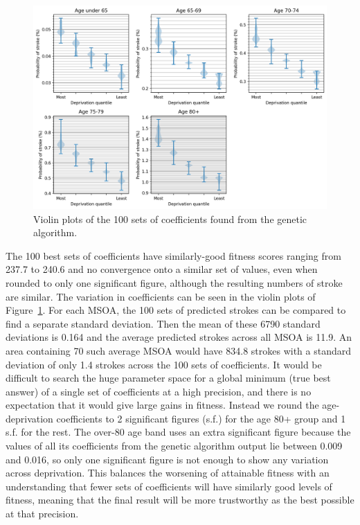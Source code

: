 \documentclass[12pt]{extarticle}
\begin{document}

\begin{figure}
    \centering
    \includegraphics[width=1.0\linewidth]{images/violin_coeffs_deap_output.png}
    \caption{Violin plots of the 100 sets of coefficients found from the genetic algorithm.}
    \label{fig:violin_coeffs_from_deap}
\end{figure}

The 100 best sets of coefficients have similarly-good fitness scores ranging from 237.7 to 240.6 and no convergence onto a similar set of values, even when rounded to only one significant figure, although the resulting numbers of stroke are similar.
The variation in coefficients can be seen in the violin plots of Figure~\ref{fig:violin_coeffs_from_deap}.
% 
For each MSOA, the 100 sets of predicted strokes can be compared to find a separate standard deviation. Then the mean of these 6790 standard deviations is 0.164 %
and the average predicted strokes across all MSOA is 11.9.
An area containing 70 such average MSOA would have 834.8 strokes with a standard deviation of only 1.4 strokes across the 100 sets of coefficients. 
% 
It would be difficult to search the huge parameter space for a global minimum (true best answer) of a single set of coefficients at a high precision,
and there is no expectation that it would give large gains in fitness.
Instead we round the age-deprivation coefficients to 2 significant figures (s.f.) for the age 80+ group and 1 s.f. for the rest.
The over-80 age band uses an extra significant figure because the values of all its coefficients from the genetic algorithm output lie between 0.009 and 0.016, so only one significant figure is not enough to show any variation across deprivation.
This balances the worsening of attainable fitness with an understanding that fewer sets of coefficients will have similarly good levels of fitness,
meaning that the final result will be more trustworthy as the best possible at that precision.
\end{document}
